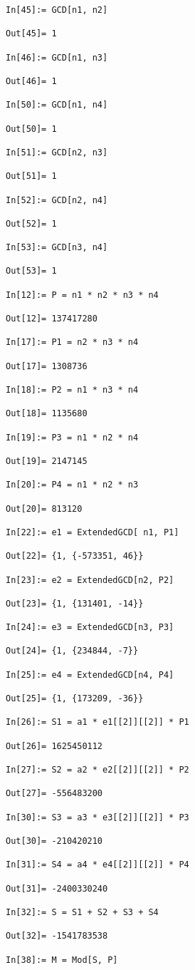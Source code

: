 \documentclass[12pt]{amsart}
\theoremstyle{definition}
\begin{document}
\begin{enumerate}
\begin{verbatim}
In[45]:= GCD[n1, n2]

Out[45]= 1

In[46]:= GCD[n1, n3]

Out[46]= 1

In[50]:= GCD[n1, n4]

Out[50]= 1

In[51]:= GCD[n2, n3]

Out[51]= 1

In[52]:= GCD[n2, n4]

Out[52]= 1

In[53]:= GCD[n3, n4]

Out[53]= 1

In[12]:= P = n1 * n2 * n3 * n4

Out[12]= 137417280

In[17]:= P1 = n2 * n3 * n4

Out[17]= 1308736

In[18]:= P2 = n1 * n3 * n4

Out[18]= 1135680

In[19]:= P3 = n1 * n2 * n4

Out[19]= 2147145

In[20]:= P4 = n1 * n2 * n3

Out[20]= 813120

In[22]:= e1 = ExtendedGCD[ n1, P1]

Out[22]= {1, {-573351, 46}}

In[23]:= e2 = ExtendedGCD[n2, P2]

Out[23]= {1, {131401, -14}}

In[24]:= e3 = ExtendedGCD[n3, P3]

Out[24]= {1, {234844, -7}}

In[25]:= e4 = ExtendedGCD[n4, P4]

Out[25]= {1, {173209, -36}}

In[26]:= S1 = a1 * e1[[2]][[2]] * P1

Out[26]= 1625450112

In[27]:= S2 = a2 * e2[[2]][[2]] * P2

Out[27]= -556483200

In[30]:= S3 = a3 * e3[[2]][[2]] * P3

Out[30]= -210420210

In[31]:= S4 = a4 * e4[[2]][[2]] * P4

Out[31]= -2400330240

In[32]:= S = S1 + S2 + S3 + S4

Out[32]= -1541783538

In[38]:= M = Mod[S, P]


\end{verbatim}
\end{enumerate}
\end{document}
